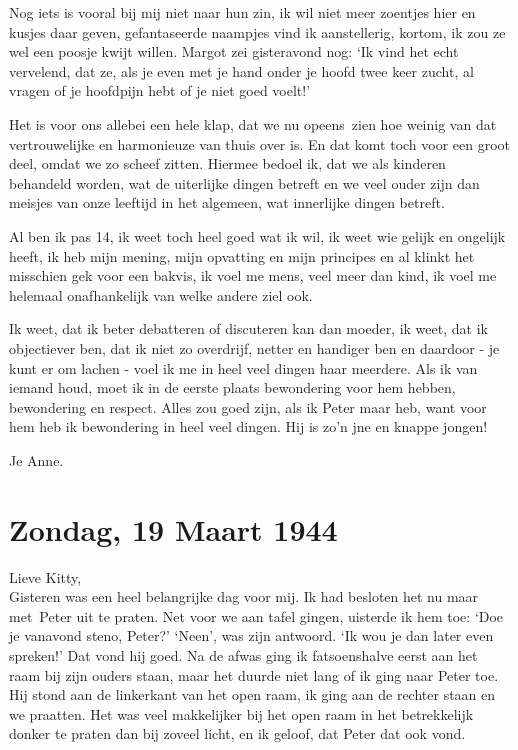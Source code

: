 \documentclass{book}
\begin{document}
Nog iets is vooral bij mij niet naar hun zin, ik wil niet meer zoentjes
hier en kusjes daar geven, gefantaseerde naampjes vind ik aanstellerig,
kortom, ik zou ze wel een poosje kwijt willen. Margot zei gisteravond
nog: `Ik vind het echt vervelend, dat ze, als je even met je hand onder
je hoofd twee keer zucht, al vragen of je hoofdpijn hebt of je niet goed
voelt!'

Het is voor ons allebei een hele klap, dat we nu opeens~zien hoe weinig
van dat vertrouwelijke en harmonieuze van thuis over is. En dat komt
toch voor een groot deel, omdat we zo scheef zitten. Hiermee bedoel ik,
dat we als kinderen behandeld worden, wat de uiterlijke dingen betreft
en we veel ouder zijn dan meisjes van onze leeftijd in het algemeen, wat
innerlijke dingen betreft.

Al ben ik pas 14, ik weet toch heel goed wat ik wil, ik weet wie gelijk
en ongelijk heeft, ik heb mijn mening, mijn opvatting en mijn principes
en al klinkt het misschien gek voor een bakvis, ik voel me mens, veel
meer dan kind, ik voel me helemaal onafhankelijk van welke andere ziel
ook.

Ik weet, dat ik beter debatteren of discuteren kan dan moeder, ik weet,
dat ik objectiever ben, dat ik niet zo overdrijf, netter en handiger ben
en daardoor - je kunt er om lachen - voel ik me in heel veel dingen haar
meerdere. Als ik van iemand houd, moet ik in de eerste plaats
bewondering voor hem hebben, bewondering en respect. Alles zou goed
zijn, als ik Peter maar heb, want voor hem heb ik bewondering in heel
veel dingen. Hij is zo'n jne en knappe jongen!

Je Anne.

\chapter{Zondag, 19 Maart 1944}

Lieve Kitty,\\Gisteren was een heel belangrijke dag voor mij. Ik had
besloten het nu maar met~Peter uit te praten. Net voor we aan tafel
gingen, uisterde ik hem toe: `Doe je vanavond steno, Peter?' `Neen', was
zijn antwoord. `Ik wou je dan later even spreken!' Dat vond hij goed. Na
de afwas ging ik fatsoenshalve eerst aan het raam bij zijn ouders staan,
maar het duurde niet lang of ik ging naar Peter toe. Hij stond aan de
linkerkant van het open raam, ik ging aan de rechter staan en we
praatten. Het was veel makkelijker bij het open raam in het betrekkelijk
donker te praten dan bij zoveel licht, en ik geloof, dat Peter dat ook
vond.
\end{document}
